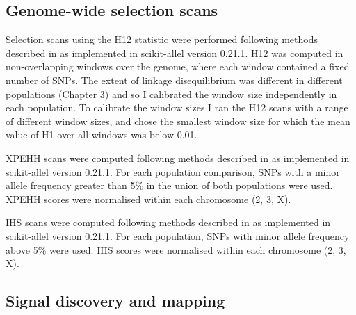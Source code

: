 \documentclass[a4paper,11pt,abstracton,hidelinks]{scrartcl}
\begin{document}
\subsection{Genome-wide selection scans}\label{subsec:methods-gwss}


Selection scans using the H12 statistic were performed following methods described in \textcite{Garud2015} as implemented in scikit-allel version 0.21.1.
%
H12 was computed in non-overlapping windows over the genome, where each window contained a fixed number of SNPs.
%
The extent of linkage disequilibrium was different in different populations (Chapter 3) and so I calibrated the window size independently in each population.
%
To calibrate the window sizes I ran the H12 scans with a range of different window sizes, and chose the smallest window size for which the mean value of H1 over all windows was below 0.01.


XPEHH scans were computed following methods described in \textcite{Sabeti2007} as implemented in scikit-allel version 0.21.1.
%
For each population comparison, SNPs with a minor allele frequency greater than 5\% in the union of both populations were used.
%
XPEHH scores were normalised within each chromosome (2, 3, X).


IHS scans were computed following methods described in \textcite{Voight2006} as implemented in scikit-allel version 0.21.1.
%
For each population, SNPs with minor allele frequency above 5\% were used.
%
IHS scores were normalised within each chromosome (2, 3, X).


\subsection{Signal discovery and mapping}\label{subsec:methods-discovery}
\end{document}
